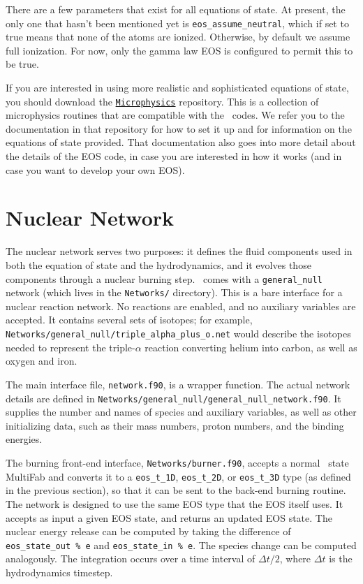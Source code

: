 There are a few parameters that exist for all equations of state.
At present, the only one that hasn't been mentioned yet is
\texttt{eos\_assume\_neutral}, which if set to true means that
none of the atoms are ionized. Otherwise, by default we assume
full ionization. For now, only the gamma law EOS is configured
to permit this to be true.

If you are interested in using more realistic and sophisticated equations of 
state, you should download the \href{https://github.com/BoxLib-Codes/Microphysics}{\tt Microphysics} 
repository. This is a collection of microphysics routines that are compatible with the 
\boxlib\ codes. We refer you to the documentation in that repository for how to set it up 
and for information on the equations of state provided. That documentation 
also goes into more detail about the details of the EOS code, in case you are interested in 
how it works (and in case you want to develop your own EOS).

\section{Nuclear Network}

The nuclear network serves two purposes: it defines the fluid components used 
in both the equation of state and the hydrodynamics, and it evolves those 
components through a nuclear burning step. \castro\ comes with a {\tt general\_null} 
network (which lives in the {\tt Networks/} directory). This is a bare interface for a
nuclear reaction network. No reactions are enabled, and no auxiliary variables 
are accepted. It contains several sets of isotopes; for example, 
{\tt Networks/general\_null/triple\_alpha\_plus\_o.net} would describe the 
isotopes needed to represent the triple-$\alpha$ reaction converting 
helium into carbon, as well as oxygen and iron.

The main interface file, {\tt network.f90}, is a wrapper function. The 
actual network details are defined in {\tt Networks/general\_null/general\_null\_network.f90}.
It supplies the number and names of species and auxiliary variables, as
well as other initializing data, such as their mass numbers, proton numbers, and the binding
energies.

The burning front-end interface, {\tt Networks/burner.f90}, accepts a normal 
\castro\ state MultiFab and converts it to a 
{\tt eos\_t\_1D}, {\tt eos\_t\_2D}, or {\tt eos\_t\_3D} type (as defined 
in the previous section), so that it can be sent to the back-end burning routine. 
The network is designed to use the same EOS type that the EOS itself uses. It 
accepts as input a given EOS state, and returns an updated EOS state. The 
nuclear energy release can be computed by taking the difference of 
{\tt eos\_state\_out \% e} and {\tt eos\_state\_in \% e}. The species 
change can be computed analogously. The integration occurs over a 
time interval of $\Delta t/2$, where $\Delta t$ is the hydrodynamics timestep.

